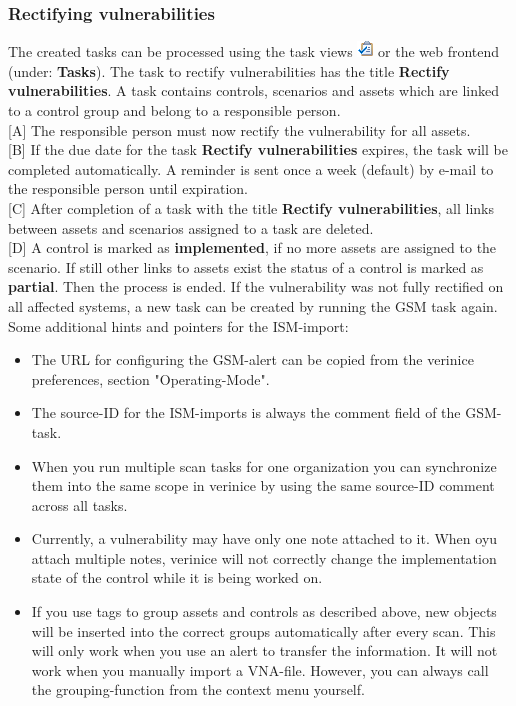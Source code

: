 \documentclass[a4paper,10pt]{book}
\begin{document}
\subsubsection{Rectifying vulnerabilities}
The created tasks can be processed using the task views \includegraphics[height=2ex]{Icon/Tasks.png} or the web frontend
(under: \textbf{Tasks}). The task to rectify vulnerabilities has the title \textbf{Rectify vulnerabilities}. A task contains controls, scenarios and assets which are linked to a control group and belong to a responsible person.
\newline\\
{[}A{]} The responsible person must now rectify the vulnerability for all assets.
\newline\\
{[}B{]} If the due date for the task \textbf{Rectify vulnerabilities} expires, the task will be completed automatically. A reminder is sent once a week (default) by e-mail to the responsible
person  until expiration.
\newline\\
{[}C{]} After completion of a task with the title  \textbf{Rectify vulnerabilities}, all links between assets and scenarios assigned to a task are deleted.
\newline\\
{[}D{]} A control is marked as \textbf{implemented}, if no more assets are assigned to the scenario. If still other links to assets exist the status of a control is marked as \textbf{partial}. Then the process is ended.
If the vulnerability was not fully rectified on all affected systems, a new task can be created by running the GSM task again.
Some additional hints and pointers for the ISM-import:
\begin{itemize}
    \item The URL for configuring the GSM-alert can be copied from the verinice preferences, section "Operating-Mode".
    \item The source-ID for the ISM-imports is always the comment field of the GSM-task.
    \item When you run multiple scan tasks for one organization you can synchronize them into the same scope in verinice by using the same source-ID comment across all tasks.
    \item Currently, a vulnerability may have only one note attached to it. When oyu attach multiple notes, verinice will not correctly change the implementation state of the control while it is being worked on.
    \item If you use tags to group assets and controls as described above, new objects will be inserted into the correct groups automatically after every scan. This will only work when you use an alert to transfer the information. It will not work when you manually import a VNA-file. However, you can always call the grouping-function from the context menu yourself.
\end{itemize}
\end{document}
